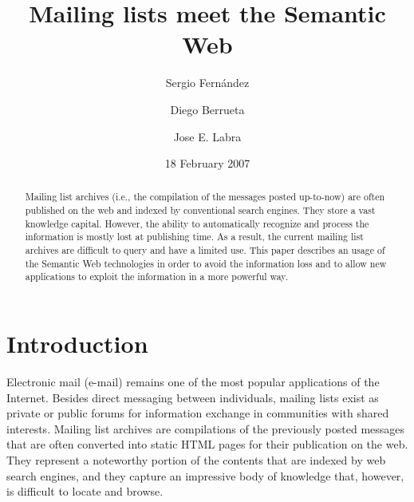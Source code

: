 \documentclass{llncs}
\begin{document}
\title{Mailing lists meet the Semantic Web}


\author{
Sergio Fern\'andez 
\and
Diego Berrueta 
\and
Jose E. Labra
}




\date{18 February 2007}

\maketitle

\begin{abstract}

Mailing list archives (i.e., the compilation of the messages posted up-to-now) are often 
published on the web and indexed by conventional search engines. They 
store a vast knowledge capital. However, the ability to automatically 
recognize and process the information is mostly lost at publishing time. 
As a result, the current mailing list archives are difficult to query and have 
a limited use. This paper describes an usage of the Semantic Web technologies 
in order to avoid the information loss and to allow new applications 
to exploit the information in a more powerful way.

\end{abstract}

\section{Introduction}

Electronic mail (e-mail) remains one of the most
popular applications of the Internet. Besides direct messaging
between individuals, mailing lists exist as private or public
forums for information exchange in communities with shared interests.
Mailing list archives are compilations of the previously posted
messages that are often converted into static HTML pages for their
publication on the web. They represent a noteworthy portion of
the contents that are indexed by web search engines, and they
capture an impressive body of knowledge that, however, is difficult
to locate and browse.
\end{document}
